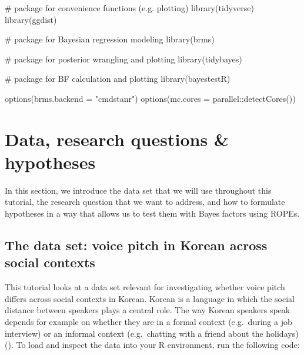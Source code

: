 \documentclass[
  doc,
  floatsintext,
  longtable,
  nolmodern,
  notxfonts,
  notimes,
  colorlinks=true,linkcolor=blue,citecolor=blue,urlcolor=blue]{apa7}
\newenvironment{Shaded}{\begin{snugshade}}{\end{snugshade}}
\newcommand{\AttributeTok}[1]{\textcolor[rgb]{0.40,0.45,0.13}{#1}}
\newcommand{\CommentTok}[1]{\textcolor[rgb]{0.37,0.37,0.37}{#1}}
\newcommand{\FunctionTok}[1]{\textcolor[rgb]{0.28,0.35,0.67}{#1}}
\newcommand{\NormalTok}[1]{\textcolor[rgb]{0.00,0.23,0.31}{#1}}
\newcommand{\SpecialCharTok}[1]{\textcolor[rgb]{0.37,0.37,0.37}{#1}}
\newcommand{\StringTok}[1]{\textcolor[rgb]{0.13,0.47,0.30}{#1}}
\begin{document}
\begin{Shaded}
\begin{Highlighting}[]
\CommentTok{\# package for convenience functions (e.g. plotting)}
\FunctionTok{library}\NormalTok{(tidyverse)}
\FunctionTok{library}\NormalTok{(ggdist)}

\CommentTok{\# package for Bayesian regression modeling}
\FunctionTok{library}\NormalTok{(brms)}

\CommentTok{\# package for posterior wrangling and plotting}
\FunctionTok{library}\NormalTok{(tidybayes)}

\CommentTok{\# package for BF calculation and plotting}
\FunctionTok{library}\NormalTok{(bayestestR)}

\FunctionTok{options}\NormalTok{(}\AttributeTok{brms.backend =} \StringTok{"cmdstanr"}\NormalTok{)}
\FunctionTok{options}\NormalTok{(}\AttributeTok{mc.cores =}\NormalTok{ parallel}\SpecialCharTok{::}\FunctionTok{detectCores}\NormalTok{())}
\end{Highlighting}
\end{Shaded}

\section{Data, research questions \&
hypotheses}\label{data-research-questions-hypotheses}

In this section, we introduce the data set that we will use throughout
this tutorial, the research question that we want to address, and how to
formulate hypotheses in a way that allows us to test them with Bayes
factors using ROPEs.

\subsection{The data set: voice pitch in Korean across social
contexts}\label{the-data-set-voice-pitch-in-korean-across-social-contexts}

This tutorial looks at a data set relevant for investigating whether
voice pitch diﬀers across social contexts in Korean. Korean is a
language in which the social distance between speakers plays a central
role. The way Korean speakers speak depends for example on whether they
are in a formal context (e.g.~during a job interview) or an informal
context (e.g.~chatting with a friend about the holidays)
(). To load and inspect the data into your R environment,
run the following code:
\end{document}
